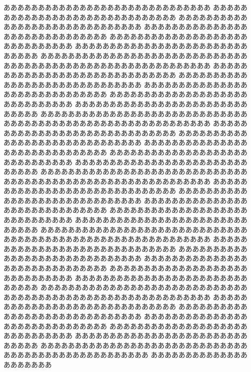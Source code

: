ああああああああああああああああああああああああああああああ
ああああああああああああああああああああああああああああああ
ああああああああああああああああああああああああああああああ
ああああああああああああああああああああああああああああああ
ああああああああああああああああああああああああああああああ
ああああああああああああああああああああああああああああああ
ああああああああああああああああああああああああああああああ
%
ああああああああああああああああああああああああああああああ
ああああああああああああああああああああああああああああああ
ああああああああああああああああああああああああああああああ
ああああああああああああああああああああああああああああああ
ああああああああああああああああああああああああああああああ
ああああああああああああああああああああああああああああああ
ああああああああああああああああああああああああああああああ
ああああああああああああああああああああああああああああああ
ああああああああああああああああああああああああああああああ
ああああああああああああああああああああああああああああああ
ああああああああああああああああああああああああああああああ
%
ああああああああああああああああああああああああああああああ
ああああああああああああああああああああああああああああああ
ああああああああああああああああああああああああああああああ
ああああああああああああああああああああああああああああああ
ああああああああああああああああああああああああああああああ
ああああああああああああああああああああああああああああああ
ああああああああああああああああああああああああああああああ
ああああああああああああああああああああああああああああああ
ああああああああああああああああああああああああああああああ
%
ああああああああああああああああああああああああああああああ
ああああああああああああああああああああああああああああああ
ああああああああああああああああああああああああああああああ
ああああああああああああああああああああああああああああああ
ああああああああああああああああああああああああああああああ
ああああああああああああああああああああああああああああああ
ああああああああああああああああああああああああああああああ
ああああああああああああああああああああああああああああああ
ああああああああああああああああああああああああああああああ
ああああああああああああああああああああああああああああああ
%
ああああああああああああああああああああああああああああああ
ああああああああああああああああああああああああああああああ
ああああああああああああああああああああああああああああああ
ああああああああああああああああああああああああああああああ
ああああああああああああああああああああああああああああああ
あああああああああああああああああああああ
あああああああああああああああああああああ
%

